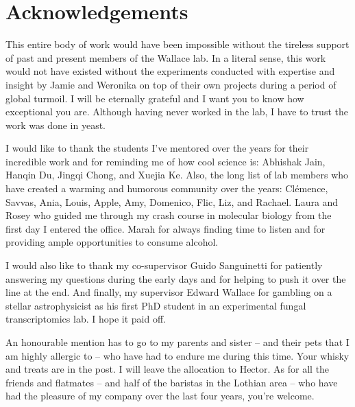 \documentclass[../main.tex]{subfiles}
\begin{document}
\chapter{Acknowledgements}
This entire body of work would have been impossible without the tireless support of past and present members of the Wallace lab.
In a literal sense, this work would not have existed without the experiments conducted with expertise and insight by Jamie and Weronika on top of their own projects during a period of global turmoil.
I will be eternally grateful and I want you to know how exceptional you are.
Although having never worked in the lab, I have to trust the work was done in yeast. 

I would like to thank the students I've mentored over the years for their incredible work and for reminding me of how cool science is: Abhishak Jain, Hanqin Du, Jingqi Chong, and Xuejia Ke. 
Also, the long list of lab members who have created a warming and humorous community over the years: Clémence, Savvas, Ania, Louis, Apple, Amy, Domenico, Flic, Liz, and Rachael.
Laura and Rosey who guided me through my crash course in molecular biology from the first day I entered the office.
Marah for always finding time to listen and for providing ample opportunities to consume alcohol.

I would also like to thank my co-supervisor Guido Sanguinetti for patiently answering my questions during the early days and for helping to push it over the line at the end.
And finally, my supervisor Edward Wallace for gambling on a stellar astrophysicist as his first PhD student in an experimental fungal transcriptomics lab. 
I hope it paid off. 

An honourable mention has to go to my parents and sister -- and their pets that I am highly allergic to -- who have had to endure me during this time.
Your whisky and treats are in the post. 
I will leave the allocation to Hector.
As for all the friends and flatmates -- and half of the baristas in the Lothian area -- who have had the pleasure of my company over the last four years, you're welcome.
\end{document}
